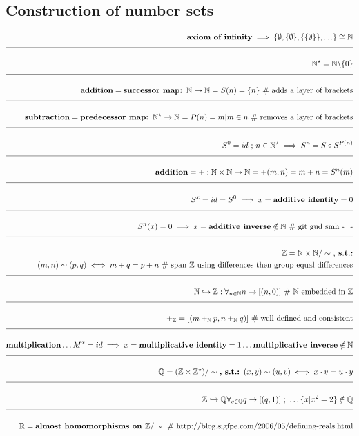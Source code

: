 \documentclass[a4paper]{article}
\newcommand{\eqComment}[1]{\text{  \# #1}}
\newcommand{\eqSep}{\text{ ;  }}
\newcommand{\n}{\\[1.5ex] \hline \nonumber \\[0ex]}
\newcommand{\m}{\nonumber \\}
\begin{document}
\subsection{Construction of number sets}
\begin{tcolorbox}
\begin{align}
   \textbf{axiom of infinity} \implies \{\emptyset, \{\emptyset\}, \{\{\emptyset\}\}, \ldots\} \cong \mathbb{N}
\n \mathbb{N}^\star = \mathbb{N} \backslash \{0\}
\n \textbf{addition} = \textbf{successor map: $\mathbb{N} \to \mathbb{N}$} = S(n) = \{n\} \eqComment{adds a layer of brackets}
\n \textbf{subtraction} = \textbf{predecessor map: $\mathbb{N}^\star \to \mathbb{N}$} = P(n) = m | m \in n \eqComment{removes a layer of brackets}
\n S^0 = id \eqSep n \in \mathbb{N}^\star \implies S^n = S \circ S^{P(n)}
\n \textbf{addition} = +: \mathbb{N} \times \mathbb{N} \to \mathbb{N} = +(m, n) = m + n = S^n(m)
\n S^x = id = S^0 \implies x = \textbf{additive identity} = 0 
\n S^n(x) = 0 \implies x = \textbf{additive inverse} \notin \mathbb{N} \eqComment{git gud smh -\_-}
\n \mathbb{Z} = \mathbb{N} \times \mathbb{N} / \sim \textbf{, s.t.:}
\m (m, n) \sim (p, q) \iff m + q = p + n \eqComment{span $\mathbb{Z}$ using differences then group equal differences}
\n \mathbb{N} \hookrightarrow \mathbb{Z}: \forall_{n \in \mathbb{N}} n \to [(n, 0)] \eqComment{$\mathbb{N}$ embedded in $\mathbb{Z}$}
\n +_\mathbb{Z} = [(m +_\mathbb{N} p, n +_\mathbb{N} q)] \eqComment{well-defined and consistent}
\n \textbf{multiplication} \ldots M^x = id \implies x = \textbf{multiplicative identity} = 1 \ldots \textbf{multiplicative inverse} \notin \mathbb{N}
\n \mathbb{Q} = (\mathbb{Z} \times \mathbb{Z}^\star) / \sim \textbf{, s.t.: } (x,y) \sim (u,v) \iff x \cdot v = u \cdot y
\n \mathbb{Z} \hookrightarrow \mathbb{Q} \forall_{q \in \mathbb{Q}} q \to [(q,1)] \eqSep \ldots \{x | x^2 = 2\} \notin \mathbb{Q}
\n \mathbb{R} = \textbf{almost homomorphisms on $\mathbb{Z}$} / \sim \eqComment{http://blog.sigfpe.com/2006/05/defining-reals.html}
\end{align}
\end{tcolorbox}
\end{document}
